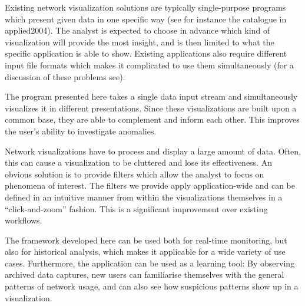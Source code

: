 Existing network visualization solutions are typically single-purpose programs which present given data in one specific way (see for instance the catalogue in  applied2004). The analyst is expected to choose in advance which kind of visualization will provide the most insight, and is then limited to what the specific application is able to show. Existing applications also require different input file formats which makes it complicated to use them simultaneously (for a discussion of these problems see). 

The program presented here takes a single data input stream and simultaneously visualizes it in different presentations. Since these visualizations are built upon a common base, they are able to complement and inform each other. This improves the user's ability to investigate anomalies.

Network visualizations have to process and display a large amount of data. Often, this can cause a visualization to be cluttered and lose its effectiveness. An obvious solution is to provide filters which allow the analyst to focus on phenomena of interest. The filters we provide apply application-wide and can be defined in an intuitive manner from within the visualizations themselves in a ``click-and-zoom'' fashion. This is a significant improvement over existing workflows.

The framework developed here can be used both for real-time monitoring, but also for historical analysis, which makes it applicable for a wide variety of use cases. Furthermore, the application can be used as a learning tool: By observing archived data captures, new users can familiarise themselves with the general patterns of network usage, and can also see how suspicious patterns show up in a visualization.
